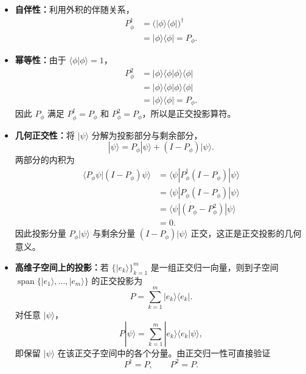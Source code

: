 \documentclass[UTF8,a4paper,11pt,openany]{ctexbook}
\begin{document}
\begin{itemize}
    \item \textbf{自伴性：}利用外积的伴随关系，
    \begin{align}
        P_\phi^\dagger
        &=
        \bigl(|\phi\rangle\langle\phi|\bigr)^\dagger
        \nonumber\\
        &=
        |\phi\rangle\langle\phi|
        =
        P_\phi.
    \end{align}

    \item \textbf{幂等性：}由于 $\langle\phi|\phi\rangle=1$，
    \begin{align}
        P_\phi^2
        &=
        |\phi\rangle\langle\phi|
        \phi\rangle\langle\phi|
        \nonumber\\
        &=
        |\phi\rangle
        \langle\phi|\phi\rangle
        \langle\phi|
        \nonumber\\
        &=
        |\phi\rangle\langle\phi|
        =
        P_\phi.
    \end{align}
    因此 $P_\phi$ 满足 $P_\phi^\dagger=P_\phi$ 和 $P_\phi^2=P_\phi$，所以是正交投影算符。

    \item \textbf{几何正交性：}将 $|\psi\rangle$ 分解为投影部分与剩余部分，
    \begin{equation}
        |\psi\rangle
        =
        P_\phi|\psi\rangle
        +
        (I-P_\phi)|\psi\rangle.
    \end{equation}
    两部分的内积为
    \begin{align}
        \langle P_\phi\psi|(I-P_\phi)\psi\rangle
        &=
        \langle\psi|
        P_\phi^\dagger(I-P_\phi)
        |\psi\rangle
        \nonumber\\
        &=
        \langle\psi|
        P_\phi(I-P_\phi)
        |\psi\rangle
        \nonumber\\
        &=
        \langle\psi|
        (P_\phi-P_\phi^2)
        |\psi\rangle
        \nonumber\\
        &=
        0.
    \end{align}
    因此投影分量 $P_\phi|\psi\rangle$ 与剩余分量 $(I-P_\phi)|\psi\rangle$ 正交，这正是正交投影的几何意义。

    \item \textbf{高维子空间上的投影：}若 $\{|e_k\rangle\}_{k=1}^{m}$ 是一组正交归一向量，则到子空间 $\operatorname{span}\{|e_1\rangle,\ldots,|e_m\rangle\}$ 的正交投影为
    \begin{equation}
        P
        =
        \sum_{k=1}^{m}
        |e_k\rangle\langle e_k|.
    \end{equation}
    对任意 $|\psi\rangle$，
    \begin{equation}
        P|\psi\rangle
        =
        \sum_{k=1}^{m}
        |e_k\rangle
        \langle e_k|\psi\rangle,
    \end{equation}
    即保留 $|\psi\rangle$ 在该正交子空间中的各个分量。由正交归一性可直接验证
    \begin{equation}
        P^\dagger=P,
        \qquad
        P^2=P.
    \end{equation}
\end{itemize}
\end{document}
